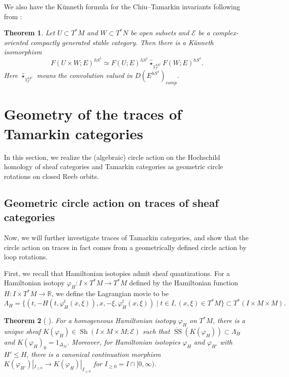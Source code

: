 \documentclass[11pt]{amsart}
\numberwithin{equation}{section}
\theoremstyle{plain}
\newtheorem{Thm}{Theorem}[section]
\theoremstyle{definition}
\theoremstyle{remark}
\newcommand{\bR} { {\mathbb{R}}}
\newcommand{\cE} { {\mathcal{E}}}
\newcommand{\sT} { {\mathscr{T}}}
\newcommand{\Sh} { {\operatorname{Sh}}}
\newcommand\ms{\operatorname{SS}}
\begin{document}
We also have the Künneth formula for the Chiu--Tamarkin invariants following from \cite[Theorem 1.8]{Li-Zhang26-1}:

\begin{Thm}\label{thm:Künneth tamarkin}
Let $U \subset T^*M$ and $W \subset T^*N$ be open subsets and $\cE$ be a complex-oriented compactly generated stable category. Then there is a Künneth isomorphism
\[F(U \times W; E)^{hS^1} \simeq F(U; E)^{hS^1} \widehat\star_{1_\sT^{hS^1}} F(W; E)^{hS^1}.\]
Here $\widehat\star_{1_\sT^{hS^1}}$ means the convolution valued in $D(E^{hS^1})_{comp}$.

\end{Thm}














\section{Geometry of the traces of Tamarkin categories}\label{section: Geometry of the trace of Tamarkin category}

In this section, we realize the (algebraic) circle action on the Hochschild homology of sheaf categories and Tamarkin categories as geometric circle rotations on closed Reeb orbits.

\subsection{Geometric circle action on traces of sheaf categories}\label{section: Geometric circle action}
Now, we will further investigate traces of Tamarkin categories, and show that the circle action on traces in fact comes from a geometrically defined circle action by loop rotations.

First, we recall that Hamiltonian isotopies admit sheaf quantizations. For a Hamiltonian isotopy $\varphi_H: I \times T^*M \to T^*M$ defined by the Hamiltonian function $H: I \times T^*M \to \bR$, we define the Lagrangian movie to be
\[\Lambda_H = \{(t, -H(t, \varphi_H^t(x, \xi)), x, -\xi, \varphi_H^t(x, \xi)) \mid t\in I, (x, \xi) \in T^*M\} \subset T^*(I \times M \times M).\]

\begin{Thm}[{\cite[Theorem 3.7 \& Proposition 4.8]{GKS2012} \cite[Proposition 3.9]{kuo2021wrapped}}]\label{thm:GKS}
    For a homogeneous Hamiltonian isotopy $\varphi_H$ on $T^*M$, there is a unique sheaf $K(\varphi_H) \in \Sh(I \times M \times M; \cE)$ such that $\dot{\ms}(K(\varphi_H)) \subset \Lambda_H$ and $K(\varphi_H)_0 = 1_{\Delta_M}$. Moreover, for Hamiltonian isotopies $\varphi_H$ and $\varphi_{H'}$ with $H' \leq H$, there is a canonical continuation morphism $K(\varphi_{H'})|_{I_{\geq 0}} \to K(\varphi_H)|_{I_{\geq 0}}$ for $I_{\geq 0}=I\cap [0,\infty)$.
\end{Thm}
\end{document}
